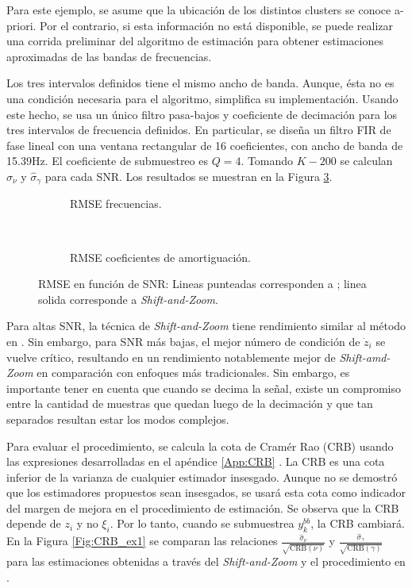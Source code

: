 			Para este ejemplo, se asume que la ubicación de los distintos clusters se conoce a-priori. Por el contrario, si esta información no está disponible, se puede realizar una corrida preliminar del algoritmo de estimación para obtener estimaciones aproximadas de las bandas de frecuencias.
			
			Los tres intervalos definidos tiene el mismo ancho de banda. Aunque, ésta no es una condición necesaria para el algoritmo, simplifica su implementación. Usando este hecho, se usa un único filtro pasa-bajos y coeficiente de decimación para los tres intervalos de frecuencia definidos. En particular, se diseña un filtro FIR de fase lineal con una ventana rectangular de 16 coeficientes, con ancho de banda de 15.39Hz. El coeficiente de submuestreo es $Q=4$. Tomando $K-200$ se calculan $\hat{\sigma}_{\nu}$ y $\hat{\sigma}_{\gamma}$ para cada SNR. Los resultados se muestran en la Figura \ref{Fig:RMSE_ex1}.
	
			\begin{figure}[t]
				\begin{subfigure}{0.5\textwidth}
					\centering	
					\resizebox{\linewidth}{!}{}
					\caption{RMSE frecuencias.}
					\label{Fig:RMSE_nu_ex1}
				\end{subfigure}
				~
				\begin{subfigure}{0.5\textwidth}
					\centering
					\resizebox{\linewidth}{!}{}
					\caption{RMSE coeficientes de amortiguación.}
					\label{Fig:RMSE_gamma_ex1}
				\end{subfigure}
				\caption{RMSE en función de SNR: Lineas punteadas corresponden a \cite{Andersson2014}; linea solida corresponde a \emph{Shift-and-Zoom}.}
				\label{Fig:RMSE_ex1}
			\end{figure}
			
			Para altas SNR, la técnica de \emph{Shift-and-Zoom} tiene rendimiento similar al método en \cite{Andersson2014}. Sin embargo, para SNR más bajas, el mejor número de condición de $\dot{z}_i$ se vuelve crítico, resultando en un rendimiento notablemente mejor de \emph{Shift-amd-Zoom} en comparación con enfoques más tradicionales. Sin embargo, es importante tener en cuenta que cuando se decima la señal, existe un compromiso entre la cantidad de muestras que quedan luego de la decimación y que tan separados resultan estar los modos complejos.
			
			Para evaluar el procedimiento, se calcula la cota de Cramér Rao (CRB) usando las expresiones desarrolladas en el apéndice \ref{App:CRB} \cite{Yao1995}. La CRB es una cota inferior de la varianza de cualquier estimador insesgado. Aunque no se demostró que los estimadores propuestos sean insesgados, se usará esta cota como indicador del margen de mejora en el procedimiento de estimación. Se observa que la CRB depende de $z_i$ y no $\xi_i$. Por lo tanto, cuando se submuestrea $y_k^{bb}$, la CRB cambiará. En la Figura \ref{Fig:CRB_ex1} se comparan las relaciones $\frac{\hat{\sigma}_{\nu}}{\sqrt{\mathrm{CRB}(\nu)}}$ y $\frac{\hat{\sigma}_{\gamma}}{\sqrt{\mathrm{CRB}(\gamma)}}$ para las estimaciones obtenidas a través del \emph{Shift-and-Zoom} y el procedimiento en \cite{Andersson2014}. 
			
